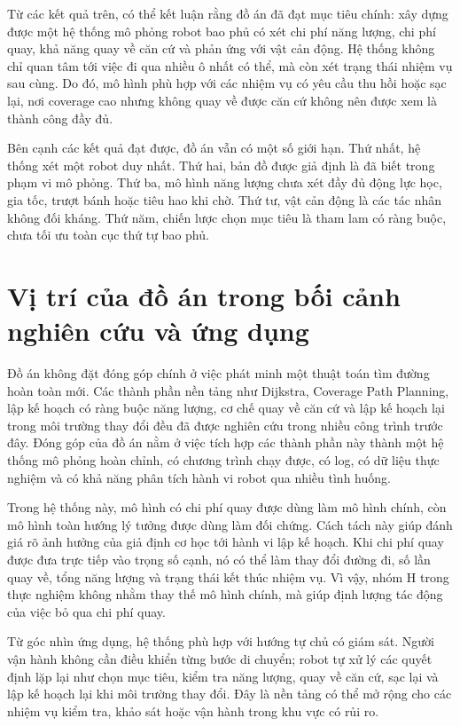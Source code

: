 \documentclass[../DoAn.tex]{subfiles}
\begin{document}
Từ các kết quả trên, có thể kết luận rằng đồ án đã đạt mục tiêu chính: xây dựng được một hệ thống mô phỏng robot bao phủ có xét chi phí năng lượng, chi phí quay, khả năng quay về căn cứ và phản ứng với vật cản động. Hệ thống không chỉ quan tâm tới việc đi qua nhiều ô nhất có thể, mà còn xét trạng thái nhiệm vụ sau cùng. Do đó, mô hình phù hợp với các nhiệm vụ có yêu cầu thu hồi hoặc sạc lại, nơi coverage cao nhưng không quay về được căn cứ không nên được xem là thành công đầy đủ.

Bên cạnh các kết quả đạt được, đồ án vẫn có một số giới hạn. Thứ nhất, hệ thống xét một robot duy nhất. Thứ hai, bản đồ được giả định là đã biết trong phạm vi mô phỏng. Thứ ba, mô hình năng lượng chưa xét đầy đủ động lực học, gia tốc, trượt bánh hoặc tiêu hao khi chờ. Thứ tư, vật cản động là các tác nhân không đối kháng. Thứ năm, chiến lược chọn mục tiêu là tham lam có ràng buộc, chưa tối ưu toàn cục thứ tự bao phủ.

\section{Vị trí của đồ án trong bối cảnh nghiên cứu và ứng dụng}

Đồ án không đặt đóng góp chính ở việc phát minh một thuật toán tìm đường hoàn toàn mới. Các thành phần nền tảng như Dijkstra, Coverage Path Planning, lập kế hoạch có ràng buộc năng lượng, cơ chế quay về căn cứ và lập kế hoạch lại trong môi trường thay đổi đều đã được nghiên cứu trong nhiều công trình trước đây. Đóng góp của đồ án nằm ở việc tích hợp các thành phần này thành một hệ thống mô phỏng hoàn chỉnh, có chương trình chạy được, có log, có dữ liệu thực nghiệm và có khả năng phân tích hành vi robot qua nhiều tình huống.

Trong hệ thống này, mô hình có chi phí quay được dùng làm mô hình chính, còn mô hình toàn hướng lý tưởng được dùng làm đối chứng. Cách tách này giúp đánh giá rõ ảnh hưởng của giả định cơ học tới hành vi lập kế hoạch. Khi chi phí quay được đưa trực tiếp vào trọng số cạnh, nó có thể làm thay đổi đường đi, số lần quay về, tổng năng lượng và trạng thái kết thúc nhiệm vụ. Vì vậy, nhóm H trong thực nghiệm không nhằm thay thế mô hình chính, mà giúp định lượng tác động của việc bỏ qua chi phí quay.

Từ góc nhìn ứng dụng, hệ thống phù hợp với hướng tự chủ có giám sát. Người vận hành không cần điều khiển từng bước di chuyển; robot tự xử lý các quyết định lặp lại như chọn mục tiêu, kiểm tra năng lượng, quay về căn cứ, sạc lại và lập kế hoạch lại khi môi trường thay đổi. Đây là nền tảng có thể mở rộng cho các nhiệm vụ kiểm tra, khảo sát hoặc vận hành trong khu vực có rủi ro.
\end{document}
